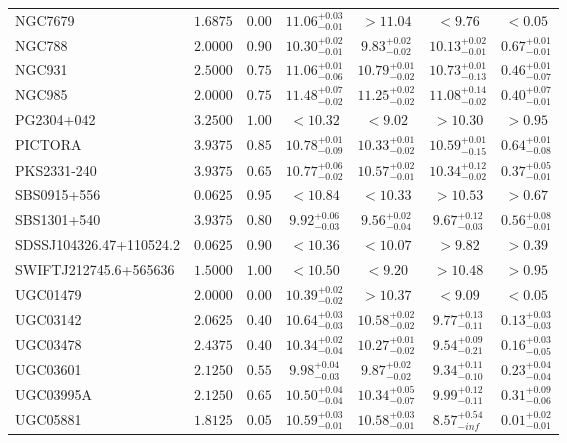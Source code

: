 \documentclass[onecolumn]{mn2e}
\begin{document}
{\begin{center}
\begin{longtable}{lcccccc}
NGC7679 & $1.6875$ & $0.00$ & $11.06_{-0.01}^{+0.03}$ & $>11.04$ & $<9.76$ &$<0.05$ \\
NGC788 & $2.0000$ & $0.90$ & $10.30_{-0.01}^{+0.02}$ & $9.83_{-0.02}^{+0.02}$ & $10.13_{-0.01}^{+0.02}$ &$0.67_{-0.01}^{+0.01}$ \\
NGC931 & $2.5000$ & $0.75$ & $11.06_{-0.06}^{+0.01}$ & $10.79_{-0.02}^{+0.01}$ & $10.73_{-0.13}^{+0.01}$ &$0.46_{-0.07}^{+0.01}$ \\
NGC985 & $2.0000$ & $0.75$ & $11.48_{-0.02}^{+0.07}$ & $11.25_{-0.02}^{+0.02}$ & $11.08_{-0.02}^{+0.14}$ &$0.40_{-0.01}^{+0.07}$ \\
PG2304+042 & $3.2500$ & $1.00$ & $<10.32$ & $<9.02$ & $>10.30$ &$>0.95$ \\
PICTORA & $3.9375$ & $0.85$ & $10.78_{-0.09}^{+0.01}$ & $10.33_{-0.02}^{+0.01}$ & $10.59_{-0.15}^{+0.01}$ &$0.64_{-0.08}^{+0.01}$ \\
PKS2331-240 & $3.9375$ & $0.65$ & $10.77_{-0.02}^{+0.06}$ & $10.57_{-0.01}^{+0.02}$ & $10.34_{-0.02}^{+0.12}$ &$0.37_{-0.01}^{+0.05}$ \\
SBS0915+556 & $0.0625$ & $0.95$ & $<10.84$ & $<10.33$ & $>10.53$ &$>0.67$ \\
SBS1301+540 & $3.9375$ & $0.80$ & $9.92_{-0.03}^{+0.06}$ & $9.56_{-0.04}^{+0.02}$ & $9.67_{-0.03}^{+0.12}$ &$0.56_{-0.01}^{+0.08}$ \\
SDSSJ104326.47+110524.2 & $0.0625$ & $0.90$ & $<10.36$ & $<10.07$ & $>9.82$ &$>0.39$ \\
SWIFTJ212745.6+565636 & $1.5000$ & $1.00$ & $<10.50$ & $<9.20$ & $>10.48$ &$>0.95$ \\
UGC01479 & $2.0000$ & $0.00$ & $10.39_{-0.02}^{+0.02}$ & $>10.37$ & $<9.09$ &$<0.05$ \\
UGC03142 & $2.0625$ & $0.40$ & $10.64_{-0.03}^{+0.03}$ & $10.58_{-0.02}^{+0.02}$ & $9.77_{-0.11}^{+0.13}$ &$0.13_{-0.03}^{+0.03}$ \\
UGC03478 & $2.4375$ & $0.40$ & $10.34_{-0.04}^{+0.02}$ & $10.27_{-0.02}^{+0.01}$ & $9.54_{-0.21}^{+0.09}$ &$0.16_{-0.05}^{+0.03}$ \\
UGC03601 & $2.1250$ & $0.55$ & $9.98_{-0.03}^{+0.04}$ & $9.87_{-0.02}^{+0.02}$ & $9.34_{-0.10}^{+0.11}$ &$0.23_{-0.04}^{+0.04}$ \\
UGC03995A & $2.1250$ & $0.65$ & $10.50_{-0.04}^{+0.04}$ & $10.34_{-0.07}^{+0.05}$ & $9.99_{-0.11}^{+0.12}$ &$0.31_{-0.06}^{+0.09}$ \\
UGC05881 & $1.8125$ & $0.05$ & $10.59_{-0.01}^{+0.03}$ & $10.58_{-0.01}^{+0.03}$ & $8.57_{-inf}^{+0.54}$ &$0.01_{-0.01}^{+0.02}$ \\

\end{longtable}
\end{center}}
\end{document}
